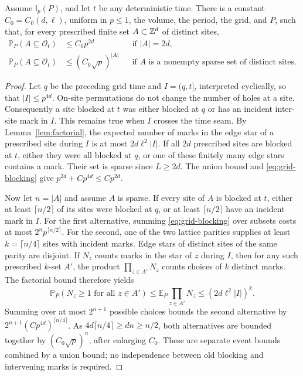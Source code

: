 \begin{lemma}\label{lem:nongrid}
Assume \(\mathsf I_p(P)\), and let \(t\) be any deterministic time.
There is a constant \(C_0=C_0(d,\ell)\), uniform in \(p\le1\), the
volume, the period, the grid, and \(P\), such that, for every prescribed
finite set \(A\subset\mathbb Z^d\) of distinct sites,
\begin{align}
 \mathbb P_P(A\subseteq\mathcal O_t)&\le C_0p^{2d}
 &&\text{if }|A|=2d,                                      \label{eq:small-blocking}\\
 \mathbb P_P(A\subseteq\mathcal O_t)&\le(C_0\sqrt p)^{|A|}
 &&\text{if }A\text{ is a nonempty sparse set of distinct sites}.
                                                               \label{eq:sparse-blocking}
\end{align}
\end{lemma}

\begin{proof}
Let \(q\) be the preceding grid time and \(I=(q,t]\), interpreted
cyclically, so that \(|I|\le p^{4d}\).  On-site permutations do not
change the number of holes at a site.  Consequently a site blocked at
\(t\) was either blocked at \(q\) or has an incident inter-site mark
in \(I\).  This remains true when \(I\) crosses the time seam.
By Lemma~\ref{lem:factorial}, the expected number of marks in the
edge star of a prescribed site during \(I\) is at most
\(2d\ell^2|I|\).
If all \(2d\) prescribed sites are blocked at \(t\), either they were
all blocked at \(q\), or one of these finitely many edge stars contains
a mark.  Their set is sparse since \(L\ge2d\).  The union bound and
\eqref{eq:grid-blocking} give
\(p^{2d}+C p^{4d}\le Cp^{2d}\).

Now let \(n=|A|\) and assume \(A\) is sparse.  If every site of \(A\)
is blocked at \(t\), either at least \(\lceil n/2\rceil\) of its sites
were blocked at \(q\), or at least \(\lceil n/2\rceil\) have an
incident mark in \(I\).  For the first alternative, summing
\eqref{eq:grid-blocking} over subsets costs at most
\(2^n p^{\lceil n/2\rceil}\).
For the second, one of the two lattice parities supplies at least
\(k=\lceil n/4\rceil\) sites with incident marks.  Edge stars of
distinct sites of the same parity are disjoint.  If \(N_z\) counts
marks in the star of \(z\) during \(I\), then for any such prescribed
\(k\)-set \(A'\), the product \(\prod_{z\in A'}N_z\) counts
choices of \(k\) distinct marks.  The factorial bound therefore yields
\[
 \mathbb P_P(N_z\ge1\text{ for all }z\in A')
 \le \mathbb E_P\prod_{z\in A'}N_z
 \le (2d\ell^2|I|)^k.
\]
Summing over at most \(2^{n+1}\) possible choices bounds the second
alternative by \(2^{n+1}(C p^{4d})^{\lceil n/4\rceil}\).
As \(4d\lceil n/4\rceil\ge dn\ge n/2\), both alternatives are
bounded together by \((C_0\sqrt p)^n\), after enlarging \(C_0\).
These are separate event bounds combined by a union bound; no
independence between old blocking and intervening marks is required.
\end{proof}

